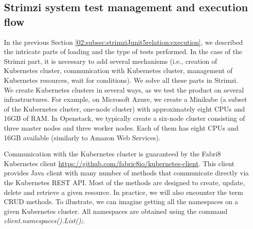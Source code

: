 \subsection{Strimzi system test management and execution flow}
\label{02:subsec:strimzisystemtestsexecution}

In the previous Section \ref{02:subsec:strimziJunit5relation:execution}, we described the intricate parts of loading and the type of tests performed.
In the case of the Strimzi part, it is necessary to add several mechanisms (i.e., creation of Kubernetes cluster, communication with Kubernetes cluster, management of Kubernetes resources, wait for conditions).
We solve all these parts in Strimzi.
We create Kubernetes clusters in several ways, as we test the product on several infrastructures.
For example, on Microsoft Azure, we create a Minikube (a subset of the Kubernetes cluster, one-node cluster) with approximately eight CPUs and 16GB of RAM. In Openstack, we typically create a six-node cluster consisting of three master nodes and three worker nodes.
Each of them has eight CPUs and 16GB available (similarly to Amazon Web Services).

Communication with the Kubernetes cluster is guaranteed by the Fabri8 Kubernetes client \url {https://github.com/fabric8io/kubernetes-client}.
This client provides Java client with many number of methods that communicate directly via the Kubernetes REST API.
Most of the methods are designed to create, update, delete and retrieve a given resource.
In practice, we will also encounter the term CRUD methods.
To illustrate, we can imagine getting all the namespaces on a given Kubernetes cluster.
All namespaces are obtained using the command \emph{client.namespaces().List();}.

